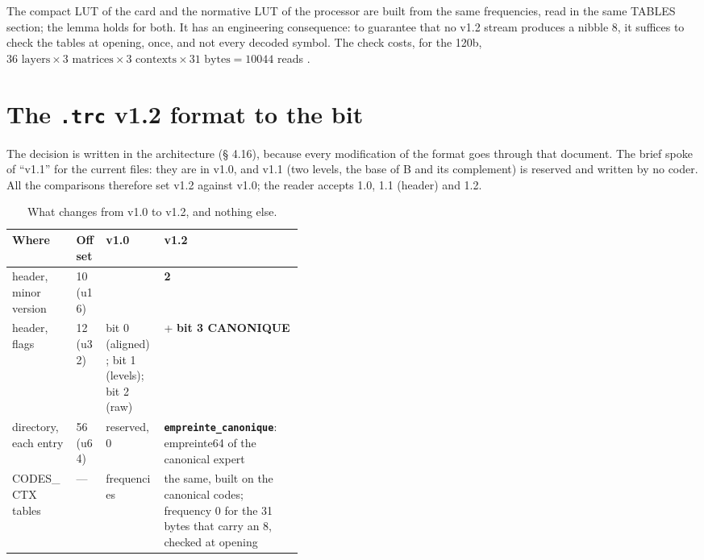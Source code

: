 The compact LUT of the card and the normative LUT of the processor are built from the same frequencies, read in the same TABLES section; the lemma holds for both. It has an engineering consequence: to guarantee that no v1.2 stream produces a nibble 8, it suffices to check the tables at opening, once, and not every decoded symbol. The check costs, for the 120b, $36 \text{ layers} \times 3 \text{ matrices} \times 3 \text{ contexts} \times 31 \text{ bytes} = \num{10044}$ reads \calc.

\section{The \texttt{.trc} v1.2 format to the bit}\label{t3cod:sec:format}

The decision is written in the architecture (§ 4.16), because every modification of the format goes through that document. The brief spoke of ``v1.1'' for the current files: they are in v1.0, and v1.1 (two levels, the base of B and its complement) is reserved and written by no coder. All the comparisons therefore set v1.2 against v1.0; the reader accepts 1.0, 1.1 (header) and 1.2.

\begin{table}[ht]
\centering\small
\caption[What changes from v1.0 to v1.2]{What changes from v1.0 to v1.2, and nothing else.}
\label{t3cod:tab:format}
\begin{tabularx}{\linewidth}{@{}>{\raggedright\arraybackslash}p{0.22\linewidth}l>{\raggedright\arraybackslash}p{0.2\linewidth}>{\raggedright\arraybackslash}X@{}}
\toprule
Where & Offset & v1.0 & v1.2 \\
\midrule
header, minor version & 10 (u16) & 0 & \textbf{2} \\
header, flags & 12 (u32) & bit 0 (aligned); bit 1 (levels); bit 2 (raw) & + \textbf{bit 3 CANONIQUE} \\
directory, each entry & 56 (u64) & reserved, 0 & \textbf{\texttt{empreinte\_canonique}}: empreinte64 of the canonical expert \\
CODES\_CTX tables & --- & 256 frequencies & the same, built on the canonical codes; frequency 0 for the 31 bytes that carry an 8, checked at opening \\
\bottomrule
\end{tabularx}
\end{table}

